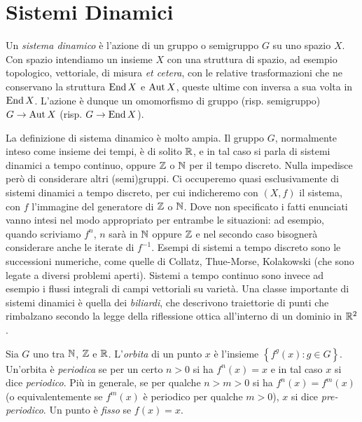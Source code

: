 \section{Sistemi Dinamici}

\begin{defi}
 Un \emph{sistema dinamico} è l'azione di un gruppo o semigruppo $G$ su uno spazio $X$. 
 Con spazio intendiamo un insieme $X$ con una struttura di spazio, ad esempio topologico, vettoriale, di misura 
 \emph{et cetera}, con le relative trasformazioni che ne conservano la struttura $\operatorname{End} X$ e $\operatorname{Aut} X$, 
 queste ultime con inversa a sua volta in $\operatorname{End} X$. L'azione è dunque un omomorfismo di gruppo (risp. semigruppo) $G\rightarrow \operatorname{Aut} X$ (risp. $G\rightarrow \operatorname{End} X$).
\end{defi}

La definizione di sistema dinamico è molto ampia. 
Il gruppo $G$, normalmente inteso come insieme dei tempi, è di solito $\mathbb{R}$, e in tal caso si parla di sistemi dinamici a tempo continuo, 
oppure $\mathbb{Z}$ o $\mathbb{N}$ per il tempo discreto. Nulla impedisce però di considerare altri (semi)gruppi. Ci occuperemo quasi esclusivamente di sistemi dinamici a tempo discreto, 
per cui indicheremo con $(X,f)$ il sistema, con $f$ l'immagine del generatore di $\mathbb{Z}$ o $\mathbb{N}$. 
Dove non specificato i fatti enunciati vanno intesi nel modo appropriato per entrambe le situazioni: 
ad esempio, quando scriviamo $f^n$, $n$ sarà in $\mathbb{N}$ oppure $\mathbb{Z}$ e nel secondo caso bisognerà considerare anche le iterate di $f^{-1}$. 
Esempi di sistemi a tempo discreto sono le successioni numeriche, come quelle di Collatz, Thue-Morse, Kolakowski (che sono legate a diversi problemi aperti).
Sistemi a tempo continuo sono invece ad esempio i flussi integrali di campi vettoriali
su varietà.
Una classe importante di sistemi dinamici è quella dei \emph{biliardi}, che descrivono traiettorie di punti che rimbalzano 
secondo la legge della riflessione ottica all'interno di un dominio in $\mathbb{R}^2$.

\begin{defi} Sia $G$ uno tra $\mathbb{N}$, $\mathbb{Z}$ e $\mathbb{R}$. L'\emph{orbita} di un punto $x$ è l'insieme $\left\{f^g(x): g\in G \right\}$. 
Un'orbita è \emph{periodica} se per un certo $n>0$ si ha $f^n(x)=x$
e in tal caso $x$ si dice \emph{periodico}. Più in generale, se
per qualche $n>m>0$ si ha $f^n(x)=f^m(x)$ (o equivalentemente se $f^m(x)$ è periodico per qualche
$m>0$), $x$ si dice \emph{pre-periodico}. 
Un punto è \emph{fisso} se $f(x)=x$.\end{defi}

